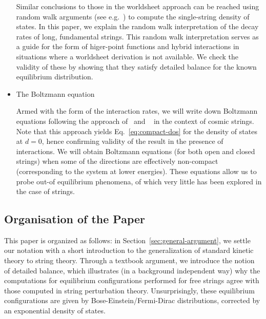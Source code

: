 \documentclass[a4paper,11pt]{article}
\begin{document}
\begin{itemize}
    Similar conclusions to those in the worldsheet approach can be reached using random walk arguments (see e.g.~\cite{Barbon:2004dd}) to compute the single-string density of states.
    In this paper, we explain the random walk interpretation of the decay rates of long, fundamental strings.
    This random walk interpretation serves as a guide for the form of higer-point functions and hybrid interactions in situations where a  worldsheet derivation is not available. We check the validity of these by showing that they satisfy detailed balance for the known equilibrium distribution. 

    \item The Boltzmann equation 


   Armed with the form of the interaction rates, we will write down Boltzmann equations following the
approach of~\cite{Lowe:1994nm,Lee:1997iz} and ~\cite{Copeland:1998na} in the context of cosmic strings.
Note that this approach yields Eq.~\eqref{eq:compact-dos} for the density of states at $d=0$, hence  confirming validity of the result in the presence of interactions.
We will obtain Boltzmann equations (for both open and closed strings)  when some of the directions are effectively non-compact (corresponding to the system at lower energies).
These equations allow us to probe out-of equilibrium phenomena, of which very little has been explored in the case of strings.

\end{itemize}


\subsection*{Organisation of the Paper}


This paper is organized as follows: in Section~\ref{sec:general-argument}, we settle our notation with a short introduction to the generalization of standard kinetic theory to string theory.
Through a textbook argument, we introduce the notion of detailed balance, which illustrates (in a background independent way) why the computations for equilibrium configurations performed for free strings agree with those computed in string perturbation theory.
Unsurprisingly, these equilibrium configurations are given by Bose-Einstein/Fermi-Dirac distributions, corrected by an exponential density of states.
\end{document}
